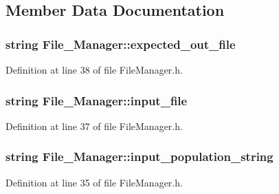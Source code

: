 \subsection{Member Data Documentation}
\hypertarget{a00001_a8b8f5c9cc3ffcb083ccc4fce1c05ca44}{
\subsubsection[{expected\-\_\-out\-\_\-file}]{\setlength{\rightskip}{0pt plus 5cm}string File\-\_\-\-Manager\-::expected\-\_\-out\-\_\-file\hspace{0.3cm}{\ttfamily [private]}}}\label{d8/d84/a00001_a8b8f5c9cc3ffcb083ccc4fce1c05ca44}


Definition at line 38 of file File\-Manager.\-h.

\hypertarget{a00001_a78b144182e3cfc70f9aae78ebdd66e51}{
\subsubsection[{input\-\_\-file}]{\setlength{\rightskip}{0pt plus 5cm}string File\-\_\-\-Manager\-::input\-\_\-file\hspace{0.3cm}{\ttfamily [private]}}}\label{d8/d84/a00001_a78b144182e3cfc70f9aae78ebdd66e51}


Definition at line 37 of file File\-Manager.\-h.

\hypertarget{a00001_a80f6d8f738cbc4d10154b470c5422fdd}{
\subsubsection[{input\-\_\-population\-\_\-string}]{\setlength{\rightskip}{0pt plus 5cm}string File\-\_\-\-Manager\-::input\-\_\-population\-\_\-string\hspace{0.3cm}{\ttfamily [private]}}}\label{d8/d84/a00001_a80f6d8f738cbc4d10154b470c5422fdd}


Definition at line 35 of file File\-Manager.\-h.

